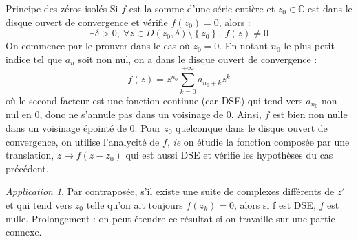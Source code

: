 \documentclass[french]{book}
\newcommand{\C}{\mathbb{C}}
\theoremstyle{plain}
\theoremstyle{definition}
\theoremstyle{remark}
\newtheorem*{app}{Application}
\begin{document}
\begin{AS}{Principe des zéros isolés} Si $f$ est la somme d'une série entière et $z_0\in\C$ est dans le disque ouvert de convergence et vérifie $f(z_0)=0$, alors : $$\exists\delta>0,\ \forall z\in D(z_0,\delta)\setminus\left\{z_0\right\},\ f(z)\ne 0$$ On commence par le prouver dans le cas où $z_0=0$. En notant $n_0$ le plus petit indice tel que $a_n$ soit non nul, on a dans le disque ouvert de convergence : $$f(z)=z^{n_0}\sum_{k=0}^{+\infty}a_{n_0+k}z^k$$ où le second facteur est une fonction continue (car DSE) qui tend vers $a_{n_0}$ non nul en $0$, donc ne s'annule pas dans un voisinage de $0$. Ainsi, $f$ est bien non nulle dans un voisinage épointé de $0$. Pour $z_0$ quelconque dans le disque ouvert de convergence, on utilise l'analycité de $f$, \textit{ie} on étudie la fonction composée par une translation, $z\mapsto f(z-z_0)$ qui est aussi DSE et vérifie les hypothèses du cas précédent.
\end{AS}
\begin{app}
	Par contraposée, s'il existe une suite de complexes différents de $z'$ et qui tend vers $z_0$ telle qu'on ait toujours $f(z_k)=0$, alors si f est DSE, $f$ est nulle. Prolongement : on peut étendre ce résultat si on travaille sur une partie connexe.
\end{app}
\end{document}
